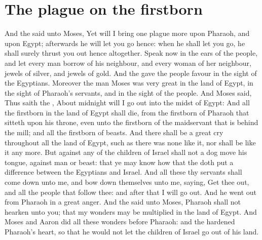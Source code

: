 \section*{The plague on the firstborn}
\begin{biblechapter} %
\verse And the \LORD said unto Moses, Yet will I bring one plague more upon Pharaoh, and upon Egypt; afterwards he will let you go hence: when he shall let you go, he shall surely thrust you out hence altogether.
\verse Speak now in the ears of the people, and let every man borrow of his neighbour, and every woman of her neighbour, jewels of silver, and jewels of gold.
\verse And the \LORD gave the people favour in the sight of the Egyptians. Moreover the man Moses was very great in the land of Egypt, in the sight of Pharaoh's servants, and in the sight of the people.
\verse And Moses said, Thus saith the \LORD, About midnight will I go out into the midst of Egypt:
\verse And all the firstborn in the land of Egypt shall die, from the firstborn of Pharaoh that sitteth upon his throne, even unto the firstborn of the maidservant that is behind the mill; and all the firstborn of beasts.
\verse And there shall be a great cry throughout all the land of Egypt, such as there was none like it, nor shall be like it any more.
\verse But against any of the children of Israel shall not a dog move his tongue, against man or beast: that ye may know how that the \LORD doth put a difference between the Egyptians and Israel.
\verse And all these thy servants shall come down unto me, and bow down themselves unto me, saying, Get thee out, and all the people that follow thee: and after that I will go out. And he went out from Pharaoh in a great anger.
\verse And the \LORD said unto Moses, Pharaoh shall not hearken unto you; that my wonders may be multiplied in the land of Egypt.
\verse And Moses and Aaron did all these wonders before Pharaoh: and the \LORD hardened Pharaoh's heart, so that he would not let the children of Israel go out of his land.
\end{biblechapter}


